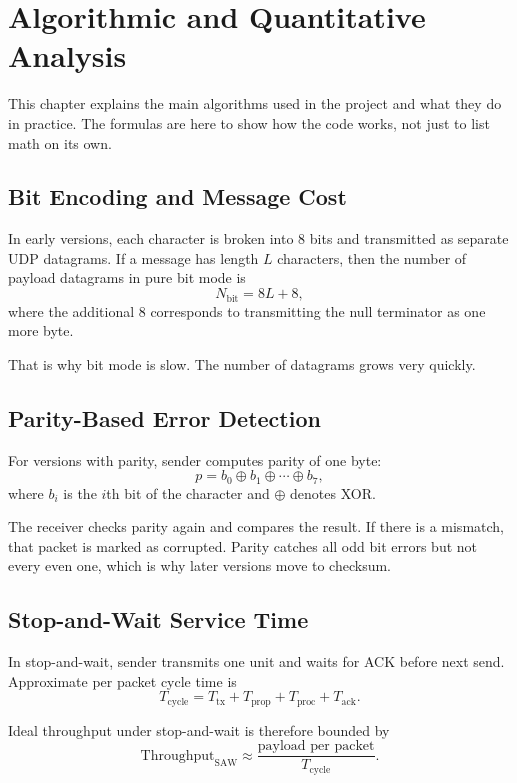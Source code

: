 \chapter{Algorithmic and Quantitative Analysis}

This chapter explains the main algorithms used in the project and what they do
in practice. The formulas are here to show how the code works, not just to
list math on its own.

\section{Bit Encoding and Message Cost}
In early versions, each character is broken into 8 bits and transmitted as
separate UDP datagrams. If a message has length $L$ characters, then the number
of payload datagrams in pure bit mode is
\begin{equation}
N_{\text{bit}} = 8L + 8,
\end{equation}
where the additional $8$ corresponds to transmitting the null terminator as one
more byte.

That is why bit mode is slow. The number of datagrams grows very quickly.

\section{Parity-Based Error Detection}
For versions with parity, sender computes parity of one byte:
\begin{equation}
p = b_0 \oplus b_1 \oplus \cdots \oplus b_7,
\end{equation}
where $b_i$ is the $i$th bit of the character and $\oplus$ denotes XOR.

The receiver checks parity again and compares the result. If there is a
mismatch, that packet is marked as corrupted. Parity catches all odd bit errors
but not every even one, which is why later versions move to checksum.

\section{Stop-and-Wait Service Time}
In stop-and-wait, sender transmits one unit and waits for ACK before next send.
Approximate per packet cycle time is
\begin{equation}
T_{\text{cycle}} = T_{\text{tx}} + T_{\text{prop}} + T_{\text{proc}} + T_{\text{ack}}.
\end{equation}

Ideal throughput under stop-and-wait is therefore bounded by
\begin{equation}
\text{Throughput}_{\text{SAW}} \approx \frac{\text{payload per packet}}{T_{\text{cycle}}}.
\end{equation}

